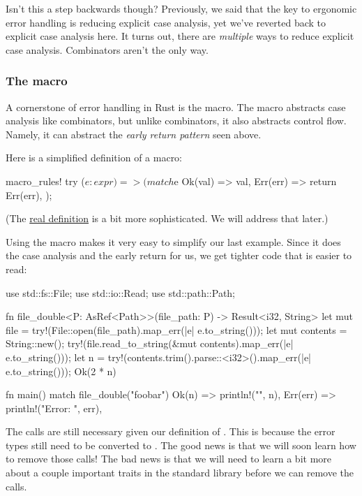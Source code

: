 \blank

Isn't this a step backwards though? Previously, we said that the key to ergonomic error handling is reducing explicit case 
analysis, yet we've reverted back to explicit case analysis here. It turns out, there are \emph{multiple} ways to reduce 
explicit case analysis. Combinators aren't the only way.

\subsubsection*{The  macro}

A cornerstone of error handling in Rust is the  macro. The  macro abstracts case analysis like 
combinators, but unlike combinators, it also abstracts control flow. Namely, it can abstract the \emph{early return 
pattern} seen above.

\blank

Here is a simplified definition of a  macro:

\begin{rustc}
macro_rules! try {
    ($e:expr) => (match $e {
        Ok(val) => val,
        Err(err) => return Err(err),
    });
}
\end{rustc}

(The \href{https://doc.rust-lang.org/std/macro.try!.html}{real definition} is a bit more sophisticated. We will address 
that later.)

\blank

Using the  macro makes it very easy to simplify our last example. Since it does the case analysis and the early 
return for us, we get tighter code that is easier to read:

\begin{rustc}
use std::fs::File;
use std::io::Read;
use std::path::Path;

fn file_double<P: AsRef<Path>>(file_path: P) -> Result<i32, String> {
    let mut file = try!(File::open(file_path).map_err(|e| e.to_string()));
    let mut contents = String::new();
    try!(file.read_to_string(&mut contents).map_err(|e| e.to_string()));
    let n = try!(contents.trim().parse::<i32>().map_err(|e| e.to_string()));
    Ok(2 * n)
}

fn main() {
    match file_double("foobar") {
        Ok(n) => println!("{}", n),
        Err(err) => println!("Error: {}", err),
    }
}
\end{rustc}

The  calls are still necessary given our definition of . This is because the error types still 
need to be converted to \String. The good news is that we will soon learn how to remove those  calls! The bad 
news is that we will need to learn a bit more about a couple important traits in the standard library before we can remove 
the  calls.

